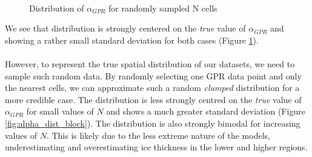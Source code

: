 \documentclass[a4, 12pt]{article}
\newcommand{\fref}[1]{(Figure \ref{#1})}
\begin{document}
\begin{figure}[h!]
\\
\caption{Distribution of $\alpha_{GPR}$ for randomly sampled N cells}
\label{fig:alpha_dist}
\end{figure}
We see that distribution is strongly centered on the \textit{true} value of $\alpha_{GPR}$ and showing a rather small standard deviation for both cases \fref{fig:alpha_dist}. 
\\
\\
However, to represent the true spatial distribution of our datasets, we need to sample such random data. By randomly selecting one GPR data point and only the nearest cells, we can approximate such a random \textit{clumped} distribution for a more credible case. The distribution is less strongly centred on the \textit{true} value of $\alpha_{GPR}$ for small values of $N$ and shows a much greater standard deviation \fref{fig:alpha_dist_block}. The distribution is also strongly bimodal for increasing values of $N$. This is likely due to the less extreme nature of the models, underestimating and overestimating ice thickness in the lower and higher regions.
\end{document}
